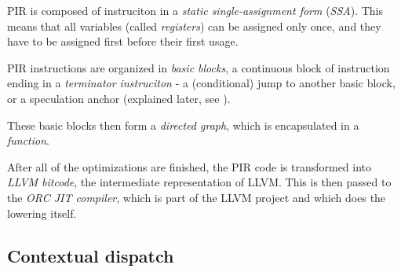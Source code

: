 PIR is composed of instruciton in a \textit{static single-assignment form} (\textit{SSA}). This means that all variables (called \textit{registers}) can be assigned only once, and they have to be assigned first before their first usage.

PIR instructions are organized in \textit{basic blocks}, a continuous block of instruction ending in a \textit{terminator instruciton} - a (conditional) jump to another basic block, or a speculation anchor (explained later, see ).

These basic blocks then form a \textit{directed graph}, which is encapsulated in a \textit{function}.

After all of the optimizations are finished, the PIR code is transformed into \textit{LLVM bitcode}, the intermediate representation of LLVM. This is then passed to the \textit{ORC JIT compiler}, which is part of the LLVM project and which does the lowering itself.

\subsection{Contextual dispatch}

%
